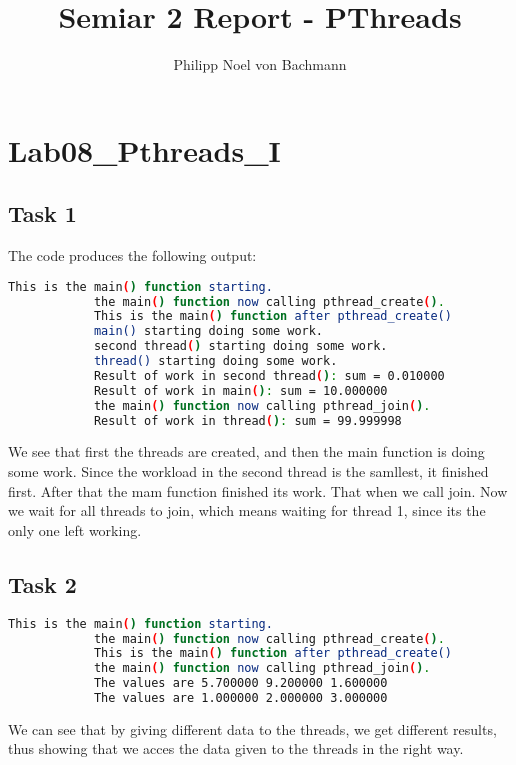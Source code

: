 \documentclass[a4paper]{scrartcl}
\title{Semiar 2 Report - PThreads}
\author{Philipp Noel von Bachmann}
\date{}
\begin{document}
\maketitle
\section{Lab08\_Pthreads\_I}
    \subsection{Task 1}
        The code produces the following output:\\
        \begin{lstlisting}[language=bash]
            This is the main() function starting.
            the main() function now calling pthread_create().
            This is the main() function after pthread_create()
            main() starting doing some work.
            second thread() starting doing some work.
            thread() starting doing some work.
            Result of work in second thread(): sum = 0.010000
            Result of work in main(): sum = 10.000000
            the main() function now calling pthread_join().
            Result of work in thread(): sum = 99.999998
        \end{lstlisting}
        We see that first the threads are created, and then the main function is
        doing some work. Since the workload in the second thread is the
        samllest, it finished first. After that the mam function finished its
        work. That when we call join. Now we wait for all threads to join, which
        means waiting for thread 1, since its the only one left working.

    \subsection{Task 2}
        \begin{lstlisting}[language=bash]
            This is the main() function starting. 
            the main() function now calling pthread_create(). 
            This is the main() function after pthread_create()
            the main() function now calling pthread_join().
            The values are 5.700000 9.200000 1.600000 
            The values are 1.000000 2.000000 3.000000 
        \end{lstlisting}
        We can see that by giving different data to the threads, we get
        different results, thus showing that we acces the data given to the
        threads in the right way.
\end{document}
